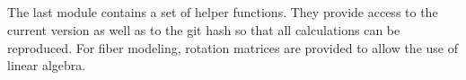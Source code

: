 \subsection{}
% 
The last module contains a set of helper functions.
They provide access to the current version as well as to the git hash so that all calculations can be reproduced.
For fiber modeling, rotation matrices are provided to allow the use of linear algebra.